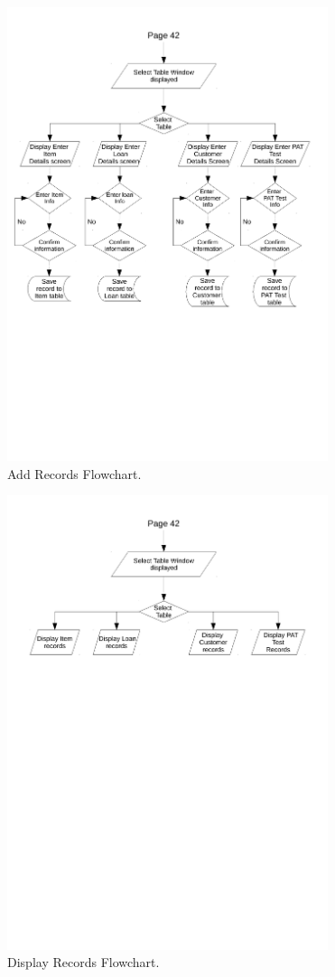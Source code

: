\begin{figure}[H]
    \begin{center}
        \includegraphics[width=355px]{./Design/system_flowcharts/PDFs/add_records_flowchart.pdf}
    \end{center}
    \caption{Add Records Flowchart.} \label{fig:print_function_result}
\end{figure}

\begin{figure}[H]
    \begin{center}
        \includegraphics[width=355px]{./Design/system_flowcharts/PDFs/display_records_flowchart.pdf}
    \end{center}
    \caption{Display Records Flowchart.} \label{fig:print_function_result}
\end{figure}


